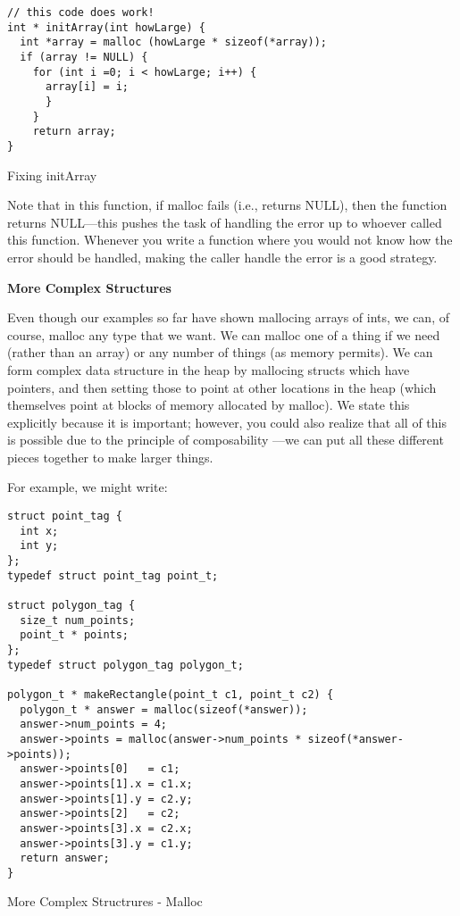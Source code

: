 \documentclass[11pt, a4paper]{article}
\begin{document}
\begin{listing}
\begin{verbatim}
// this code does work!
int * initArray(int howLarge) {
  int *array = malloc (howLarge * sizeof(*array));
  if (array != NULL) {
    for (int i =0; i < howLarge; i++) {
      array[i] = i;
 	  }
 	}
 	return array;
}
\end{verbatim}
\caption{Fixing initArray}
\label{lst:fixing_initarray}
\end{listing}


Note that in this function, if malloc fails (i.e., returns NULL), then the function returns NULL—this pushes the task of handling the error up to whoever called this function. Whenever you write a function where you would not know how the error should be handled, making the caller handle the error is a good strategy.




\textbf{More Complex Structures}


Even though our examples so far have shown mallocing arrays of ints, we can, of course, malloc any type that we want. We can malloc one of a thing if we need (rather than an array) or any number of things (as memory permits). We can form complex data structure in the heap by mallocing structs which have pointers, and then setting those to point at other locations in the heap (which themselves point at blocks of memory allocated by malloc). We state this explicitly because it is important; however, you could also realize that all of this is possible due to the principle of composability —we can put all these different pieces together to make larger things.

For example, we might write:



\begin{listing}
\begin{verbatim}
struct point_tag {
  int x;
  int y;
};
typedef struct point_tag point_t;

struct polygon_tag {
  size_t num_points;
  point_t * points;
};
typedef struct polygon_tag polygon_t;
 	
polygon_t * makeRectangle(point_t c1, point_t c2) {
  polygon_t * answer = malloc(sizeof(*answer));
  answer->num_points = 4;
  answer->points = malloc(answer->num_points * sizeof(*answer->points));
  answer->points[0]   = c1;
  answer->points[1].x = c1.x;
  answer->points[1].y = c2.y;
  answer->points[2]   = c2;
  answer->points[3].x = c2.x;
  answer->points[3].y = c1.y;
  return answer;
}
\end{verbatim}
\caption{More Complex Structrures - Malloc}
\label{lst:more_complex_structrures_malloc}
\end{listing}
\end{document}
